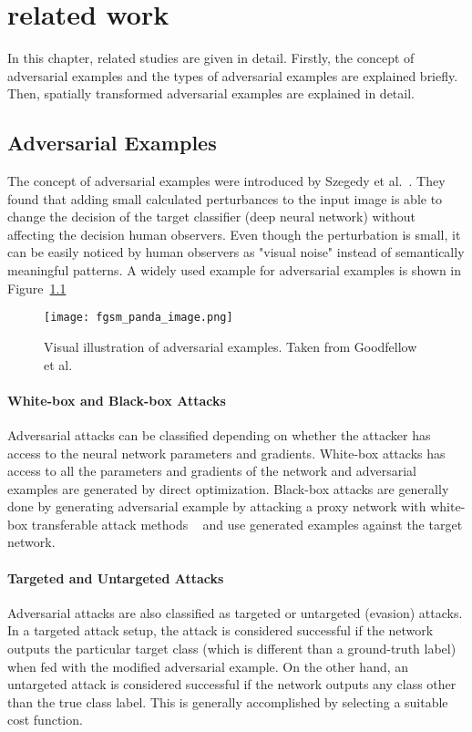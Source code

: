 \chapter{related work}
\label{chp:2_literature}

In this chapter, related studies are given in detail. Firstly, the concept of adversarial examples and the types of adversarial examples are explained briefly. Then, spatially transformed adversarial examples are explained in detail.
\section{Adversarial Examples}

The concept of adversarial examples were introduced by Szegedy et al.~\cite{szegedy2013intriguing}. They found that adding small calculated perturbances to the input image is able to change the decision of the target classifier (deep neural network) without affecting the decision human observers. Even though the perturbation is small, it can be easily noticed by human observers as "visual noise" instead of semantically meaningful patterns. A widely used example for adversarial examples is shown in Figure~\ref{fig:advexample}

\begin{figure}[h]
    \centering
    \texttt{[image: fgsm\_panda\_image.png]}
    \caption{Visual illustration of adversarial examples. Taken from Goodfellow et al.~\cite{goodfellow2014explaining}}\label{fig:advexample}
\end{figure}


\subsubsection*{White-box and Black-box Attacks}
Adversarial attacks can be classified depending on whether the attacker has access to the neural network parameters and gradients. White-box attacks has access to all the parameters and gradients of the network and adversarial examples are generated by direct optimization. Black-box attacks are generally done by generating adversarial example by attacking a proxy network with white-box transferable attack methods ~\cite{tramer2017space} and use generated examples against the target network.

\subsubsection*{Targeted and Untargeted Attacks}
Adversarial attacks are also classified as targeted or untargeted (evasion) attacks. In a targeted attack setup, the attack is considered successful if the network outputs the particular target class (which is different than a ground-truth label) when fed with the modified adversarial example. On the other hand, an untargeted attack is considered successful if the network outputs any class other than the true class label. This is generally accomplished by selecting a suitable cost function.

